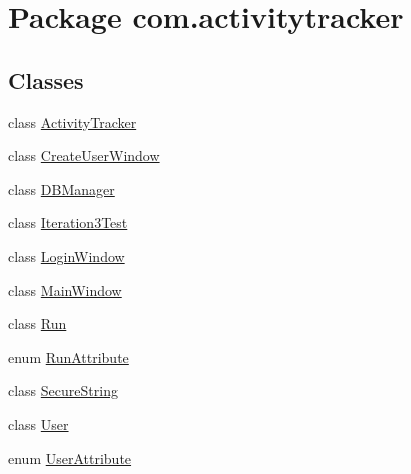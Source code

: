 \hypertarget{namespacecom_1_1activitytracker}{}\section{Package com.\+activitytracker}
\label{namespacecom_1_1activitytracker}
\subsection*{Classes}
\begin{DoxyCompactItemize}
\item 
class \mbox{\hyperlink{classcom_1_1activitytracker_1_1_activity_tracker}{Activity\+Tracker}}
\item 
class \mbox{\hyperlink{classcom_1_1activitytracker_1_1_create_user_window}{Create\+User\+Window}}
\item 
class \mbox{\hyperlink{classcom_1_1activitytracker_1_1_d_b_manager}{D\+B\+Manager}}
\item 
class \mbox{\hyperlink{classcom_1_1activitytracker_1_1_iteration3_test}{Iteration3\+Test}}
\item 
class \mbox{\hyperlink{classcom_1_1activitytracker_1_1_login_window}{Login\+Window}}
\item 
class \mbox{\hyperlink{classcom_1_1activitytracker_1_1_main_window}{Main\+Window}}
\item 
class \mbox{\hyperlink{classcom_1_1activitytracker_1_1_run}{Run}}
\item 
enum \mbox{\hyperlink{enumcom_1_1activitytracker_1_1_run_attribute}{Run\+Attribute}}
\item 
class \mbox{\hyperlink{classcom_1_1activitytracker_1_1_secure_string}{Secure\+String}}
\item 
class \mbox{\hyperlink{classcom_1_1activitytracker_1_1_user}{User}}
\item 
enum \mbox{\hyperlink{enumcom_1_1activitytracker_1_1_user_attribute}{User\+Attribute}}
\end{DoxyCompactItemize}
